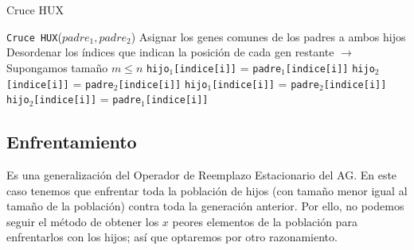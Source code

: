 \begin{algorithm}[H]
\caption{Cruce HUX}\label{alg:HUX}
\begin{algorithmic}[1]
\Procedure \texttt{Cruce HUX}($padre_1, padre_2$)
\State Asignar los genes comunes de los padres a ambos hijos
\State Desordenar los índices que indican la posición de cada gen restante $\xrightarrow{}{}$ Supongamos tamaño $m \leq n$
		\State \texttt{hijo$_1$[indice[i]]} = \texttt{padre$_1$[indice[i]]}
		\State \texttt{hijo$_2$[indice[i]]} = \texttt{padre$_2$[indice[i]]}
	\Else
		\State \texttt{hijo$_1$[indice[i]]} = \texttt{padre$_2$[indice[i]]}
		\State \texttt{hijo$_2$[indice[i]]} = \texttt{padre$_1$[indice[i]]}
	\EndIf
\EndFor
\EndProcedure
\end{algorithmic}
\end{algorithm}

\subsection{Enfrentamiento}

Es una generalización del Operador de Reemplazo Estacionario del AG. 
En este caso tenemos que enfrentar toda la población de hijos (con tamaño menor igual al tamaño de la población) contra toda la generación anterior. 
Por ello, no podemos seguir el método de obtener los $x$ peores elementos de la población para enfrentarlos con los hijos; así que optaremos por otro razonamiento. 


